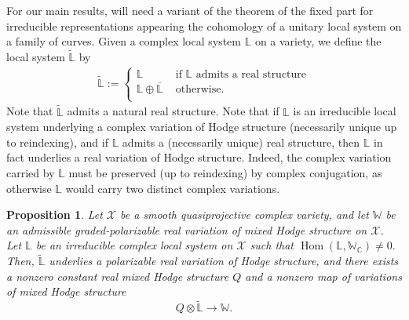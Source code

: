 \documentclass[12 pt]{amsart}
\theoremstyle{plain}
\newtheorem{proposition}[subsubsection]{Proposition}
\theoremstyle{definition}
\theoremstyle{remark}
\numberwithin{equation}{section}
\DeclareMathOperator\Hom{Hom}
\begin{document}
For our main results, will need a variant of the theorem of the fixed part for irreducible representations appearing
the cohomology of a unitary local system on a family of curves.
Given a complex local system $\mathbb L$ on a variety, we define the local system
$\widetilde{\mathbb L}$ by
\begin{align}
	\label{equation:real-construction}
	\widetilde{\mathbb L} :=
	\begin{cases}
		\mathbb L & \text{ if $\mathbb L$ admits a real structure}  \\
		\mathbb L \oplus \overline{\mathbb L} & \text{ otherwise.}  \\
	\end{cases}
\end{align}
Note that $\widetilde{\mathbb L}$ admits a natural real structure. Note that if $\mathbb{L}$ is an irreducible local system underlying a complex variation of Hodge structure (necessarily unique up to reindexing), and if $\mathbb{L}$ admits a (necessarily unique) real structure, then $\mathbb{L}$ in fact underlies a real variation of Hodge structure. Indeed, the complex variation carried by $\mathbb{L}$ must be preserved (up to reindexing) by complex conjugation, as otherwise $\mathbb{L}$ would carry two distinct complex variations.
\begin{proposition}\label{proposition:subrep-real-variation}
	Let $\mathscr{X}$ be a smooth quasiprojective complex variety, and let $\mathbb{W}$ be an admissible graded-polarizable real variation of mixed Hodge structure on $\mathscr{X}$. Let $\mathbb{L}$ be an irreducible complex local system on $\mathscr{X}$ such that $\Hom(\mathbb{L}, \mathbb{W}_\mathbb{C})\not = 0.$ 
	Then, $\widetilde{\mathbb L}$ underlies a polarizable real variation of Hodge structure, and there exists a nonzero \emph{constant} real  mixed Hodge structure $Q$ and a nonzero map of variations of mixed Hodge structure $$Q\otimes \widetilde{\mathbb{L}}\to \mathbb{W}.$$
	\end{proposition}
\end{document}
